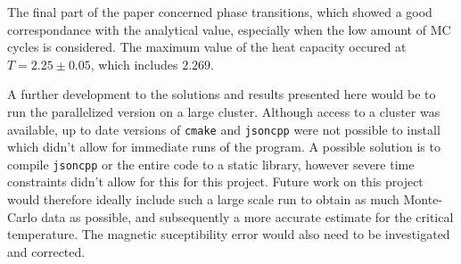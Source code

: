 \documentclass[aps,reprint]{revtex4-1}
\newcommand\blankpage{%
  \null
  \thispagestyle{empty}%
  \addtocounter{page}{-1}%
  \newpage}
\begin{document}
The final part of the paper concerned phase transitions, which showed a good
correspondance with the analytical value, especially when the low amount of MC cycles
is considered. The maximum value of the heat capacity occured at $T = 2.25 \pm 0.05$, which
includes $2.269$.

A further development to the solutions and results presented here would be to
run the parallelized version on a large cluster. Although access to a cluster
was available, up to date versions of \texttt{cmake} and \texttt{jsoncpp} were not possible to install
which didn't allow for immediate runs of the program. A possible solution is to
compile \texttt{jsoncpp} or the entire code to a static library, however severe
time constraints didn't allow for this for this project. Future work on this
project would therefore ideally include such a large scale run to obtain as much
Monte-Carlo data as possible, and subsequently a more accurate estimate for the
critical temperature. The magnetic suceptibility error would also need to be
investigated and corrected.

\blankpage
\end{document}
